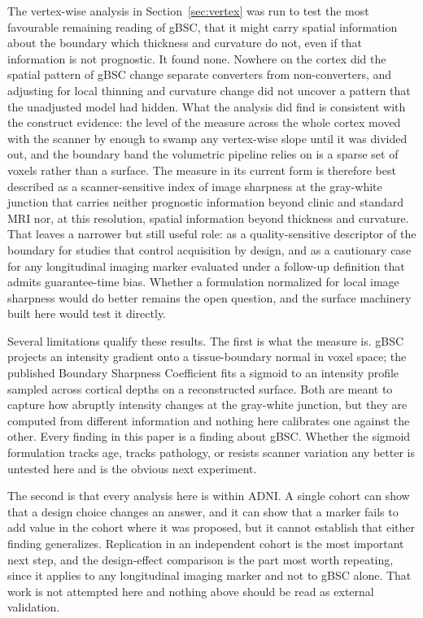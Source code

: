 \documentclass[blue]{ludusofficial}  %
\begin{document}
The vertex-wise analysis in Section~\ref{sec:vertex} was run to test the most favourable remaining reading of gBSC, that it might carry spatial information about the boundary which thickness and curvature do not, even if that information is not prognostic. It found none. Nowhere on the cortex did the spatial pattern of gBSC change separate converters from non-converters, and adjusting for local thinning and curvature change did not uncover a pattern that the unadjusted model had hidden. What the analysis did find is consistent with the construct evidence: the level of the measure across the whole cortex moved with the scanner by enough to swamp any vertex-wise slope until it was divided out, and the boundary band the volumetric pipeline relies on is a sparse set of voxels rather than a surface. The measure in its current form is therefore best described as a scanner-sensitive index of image sharpness at the gray-white junction that carries neither prognostic information beyond clinic and standard MRI nor, at this resolution, spatial information beyond thickness and curvature. That leaves a narrower but still useful role: as a quality-sensitive descriptor of the boundary for studies that control acquisition by design, and as a cautionary case for any longitudinal imaging marker evaluated under a follow-up definition that admits guarantee-time bias. Whether a formulation normalized for local image sharpness would do better remains the open question, and the surface machinery built here would test it directly.

Several limitations qualify these results. The first is what the measure is. gBSC projects an intensity gradient onto a tissue-boundary normal in voxel space; the published Boundary Sharpness Coefficient fits a sigmoid to an intensity profile sampled across cortical depths on a reconstructed surface. Both are meant to capture how abruptly intensity changes at the gray-white junction, but they are computed from different information and nothing here calibrates one against the other. Every finding in this paper is a finding about gBSC. Whether the sigmoid formulation tracks age, tracks pathology, or resists scanner variation any better is untested here and is the obvious next experiment.

The second is that every analysis here is within ADNI. A single cohort can show that a design choice changes an answer, and it can show that a marker fails to add value in the cohort where it was proposed, but it cannot establish that either finding generalizes. Replication in an independent cohort is the most important next step, and the design-effect comparison is the part most worth repeating, since it applies to any longitudinal imaging marker and not to gBSC alone. That work is not attempted here and nothing above should be read as external validation.
\end{document}
